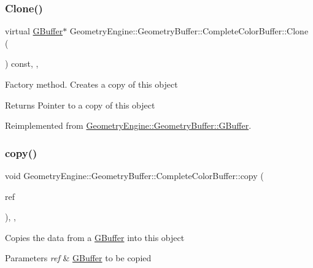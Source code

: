 \subsubsection{\texorpdfstring{Clone()}{Clone()}}
{\footnotesize\ttfamily virtual \mbox{\hyperlink{class_geometry_engine_1_1_geometry_buffer_1_1_g_buffer}{G\+Buffer}}$\ast$ Geometry\+Engine\+::\+Geometry\+Buffer\+::\+Complete\+Color\+Buffer\+::\+Clone (\begin{DoxyParamCaption}{ }\end{DoxyParamCaption}) const\hspace{0.3cm}{\ttfamily [inline]}, {\ttfamily [override]}, {\ttfamily [virtual]}}

Factory method. Creates a copy of this object \begin{DoxyReturn}{Returns}
Pointer to a copy of this object 
\end{DoxyReturn}


Reimplemented from \mbox{\hyperlink{class_geometry_engine_1_1_geometry_buffer_1_1_g_buffer_af993f8c23f7e78051f3071be4873af9d}{Geometry\+Engine\+::\+Geometry\+Buffer\+::\+G\+Buffer}}.

\mbox{\label{class_geometry_engine_1_1_geometry_buffer_1_1_complete_color_buffer_a0630be352a9267083d42802fb22ae36b}} 
\subsubsection{\texorpdfstring{copy()}{copy()}}
{\footnotesize\ttfamily void Geometry\+Engine\+::\+Geometry\+Buffer\+::\+Complete\+Color\+Buffer\+::copy (\begin{DoxyParamCaption}\item[{const \mbox{\hyperlink{class_geometry_engine_1_1_geometry_buffer_1_1_g_buffer}{G\+Buffer}} \&}]{ref }\end{DoxyParamCaption})\hspace{0.3cm}{\ttfamily [override]}, {\ttfamily [protected]}, {\ttfamily [virtual]}}

Copies the data from a \mbox{\hyperlink{class_geometry_engine_1_1_geometry_buffer_1_1_g_buffer}{G\+Buffer}} into this object 
\begin{DoxyParams}{Parameters}
{\em ref} & \mbox{\hyperlink{class_geometry_engine_1_1_geometry_buffer_1_1_g_buffer}{G\+Buffer}} to be copied \\
\hline
\end{DoxyParams}


